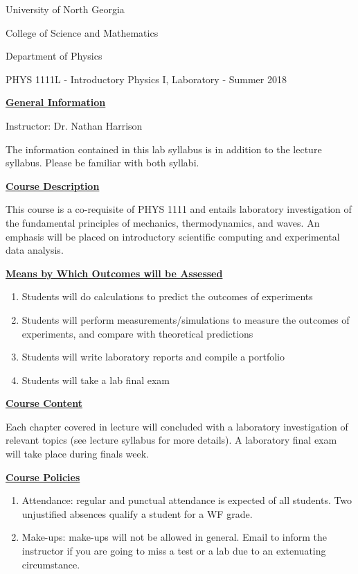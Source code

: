 \documentclass[12pt]{article}
\begin{document}
{\centering
\large University of North Georgia \par
\large College of Science and Mathematics \par
\large Department of Physics \par
\large PHYS 1111L - Introductory Physics I, Laboratory - Summer 2018 \par
}
\hfill \break \vspace{-4mm}

\underline{\textbf{General Information}} \par
Instructor: Dr. Nathan Harrison \par
The information contained in this lab syllabus is in addition to the lecture syllabus. Please be familiar with both syllabi.
\hfill \break

\underline{\textbf{Course Description}} \par
This course is a co-requisite of PHYS 1111 and entails laboratory investigation of the fundamental principles of mechanics, thermodynamics, and waves.
An emphasis will be placed on introductory scientific computing and experimental data analysis.
\hfill \break

\underline{\textbf{Means by Which Outcomes will be Assessed}} \par
\begin{enumerate}
\item Students will do calculations to predict the outcomes of experiments
\item Students will perform measurements/simulations to measure the outcomes of experiments, and compare with theoretical predictions
\item Students will write laboratory reports and compile a portfolio
\item Students will take a lab final exam
\end{enumerate}

\underline{\textbf{Course Content}} \par
Each chapter covered in lecture will concluded with a laboratory investigation of relevant topics (see lecture syllabus for more details).
A laboratory final exam will take place during finals week.
\hfill \break

\underline{\textbf{Course Policies}} \par
\begin{enumerate}
\item Attendance: regular and punctual attendance is expected of all students. Two unjustified absences qualify a student for a WF grade.
\item Make-ups: make-ups will not be allowed in general. Email to inform the instructor if you are going to miss a test or a lab due to an extenuating circumstance.
\end{enumerate}
\end{document}
